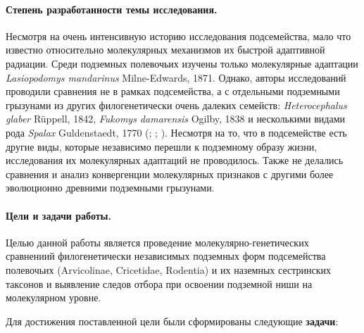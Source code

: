 

\paragraph{Степень разработанности темы исследования.} Несмотря на очень интенсивную историю исследования подсемейства, мало что известно относительно молекулярных механизмов их быстрой адаптивной радиации. Среди подземных полевочьих изучены только молекулярные адаптации \textit{Lasiopodomys mandarinus} Milne-Edwards, 1871. Однако, авторы исследований проводили сравнения не в рамках подсемейства, а с отдельными подземными грызунами из других филогенетически очень далеких семейств: \textit{Heterocephalus glaber} Rüppell, 1842, \textit{Fukomys damarensis} Ogilby, 1838 и несколькими видами рода \textit{Spalax} Guldenstaedt, 1770 (\cite{Sun2020}; \cite{Sun2018a}; \cite{Dong2020}). Несмотря на то, что в подсемействе есть другие виды, которые независимо перешли к подземному образу жизни, исследования их молекулярных адаптаций не проводилось. Также не делались сравнения и анализ конвергенции молекулярных признаков с другими более эволюционно древними подземными грызунами.


\paragraph{Цели и задачи работы.} Целью данной работы является проведение молекулярно-генетических сравнениий филогенетически независимых подземных форм подсемейства полевочьих (Arvicolinae, Cricetidae, Rodentia) и их наземных сестринских таксонов и выявление следов отбора при освоении подземной ниши на молекулярном уровне.

\vspace{3mm}
Для достижения поставленной цели были сформированы следующие \textbf{задачи}:

